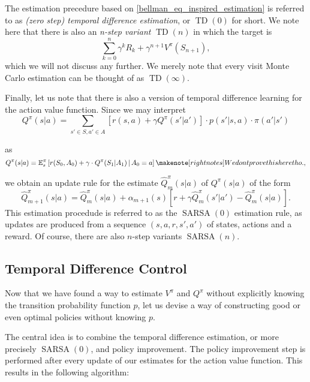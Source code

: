 The estimation precedure based on \eqref{bellman_eq_inspired_estimation} is referred to as \emph{(zero step) temporal difference estimation}, or \( \operatorname{TD}(0) \) for short. We note here that there is also an \emph{n-step variant} \( \operatorname{TD}(n) \) in which the target is 
\[
    \sum_{k=0}^n \gamma^k R_k + \gamma^{n+1}V^\pi(S_{n+1}),
\]  
which we will not discuss any further. We merely note that every visit Monte Carlo estimation can be thought of as \( \operatorname{TD}(\infty) \).

Finally, let us note that there is also a version of temporal difference learning for the action value function. Since we may interpret 
\[
    Q^\pi(s|a) = \sum_{s' \in S, a' \in A} \left[ r(s,a) + \gamma Q^\pi(s' | a') \right] \cdot p(s'|s,a) \cdot \pi(a'|s')
\]

as 
\[
    Q^\pi(s|a) = \mathbb{E}_s^\pi \left[ r(S_{0},A_{0}) + \gamma \cdot Q^\pi(S_{1} | A_{1}) \,|\, A_{0} = a \right] \note{We dont prove this here tho.},
\]

we obtain an update rule for the estimate \( \hat{Q}_m^\pi(s|a)  \) of \( Q^\pi(s|a) \)  of the form
\[
    \hat{Q}^\pi_{m+1}(s|a) = \hat{Q}_m^\pi(s|a) + \alpha_{m+1}(s) \left[ r + \gamma \hat{Q}_m^\pi(s'|a') - \hat{Q}_m^\pi(s|a) \right].
\]
This estimation procedude is referred to as the \( \operatorname{SARSA}(0) \) estimation rule, as updates are produced from a sequence \( (s,a,r,s',a') \) of states, actions and a reward. Of course, there are also \( n \)-step variants \( \operatorname{SARSA}(n) \).






\subsection{Temporal Difference Control}
Now that we have found a way to estimate \( V^\pi \) and \( Q^\pi \) without explicitly knowing the transition probability function \( p \), let us devise a way of constructing good or even optimal policies without knowing \( p \).

The central idea is to combine the temporal difference estimation, or more precisely \( \operatorname{SARSA}(0) \), and policy improvement. The policy improvement step is performed after every update of our estimates for the action value function. This results in the following algorithm:

